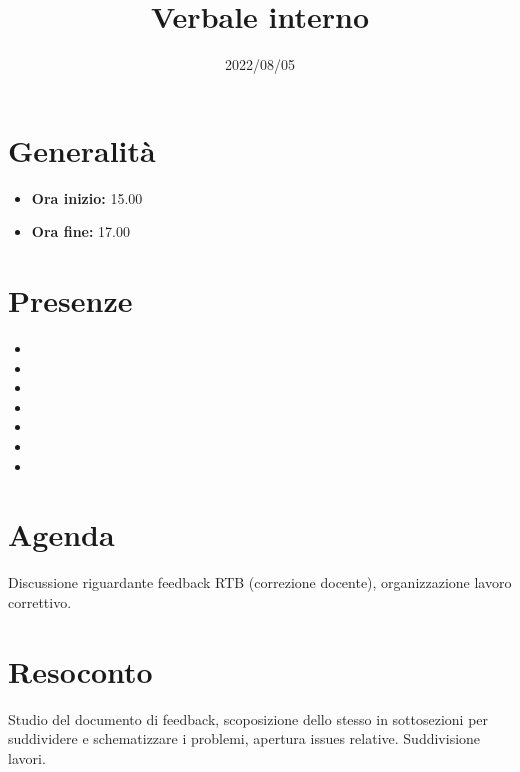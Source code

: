 \documentclass{classes/base}
\title{Verbale interno}
\date{2022/08/05}
\author{\marcob}
\renewcommand{\maketitle}{
    
}
\begin{document}
    \maketitle

    \section*{Generalità}
    \begin{itemize}
        \item \textbf{Ora inizio:} 15.00
        \item \textbf{Ora fine:} 17.00
    \end{itemize}

    \section*{Presenze}
    \begin{itemize}
    	\item \angela
        \item \marcob
        \item \matteo
        \item \marcov
        \item \giulio
        \item \ruth
        \item \tommaso
    \end{itemize}

    \section*{Agenda}
    Discussione riguardante feedback RTB (correzione docente), organizzazione lavoro correttivo.

    \section*{Resoconto}
    Studio del documento di feedback, scoposizione dello stesso in sottosezioni 
    per suddividere e schematizzare i problemi, apertura issues relative. 
    Suddivisione lavori.
\end{document}
